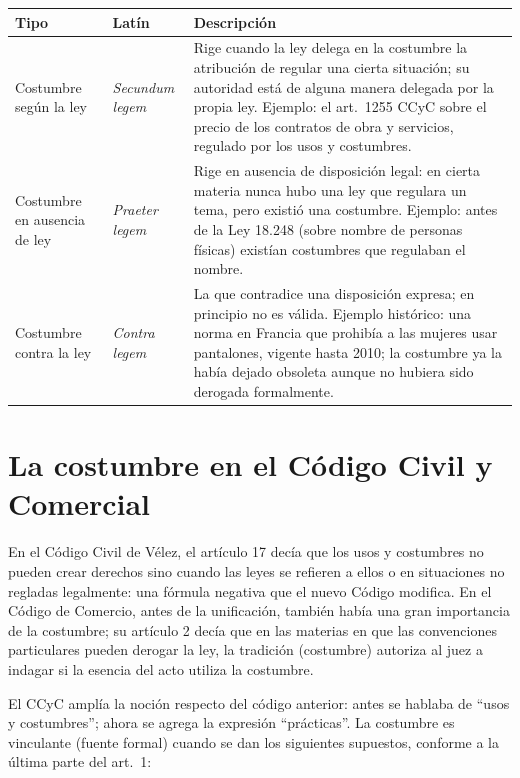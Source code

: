 \documentclass[12pt,oneside]{book}
\begin{document}
\begin{table}[H]
\centering
\begin{tabularx}{\textwidth}{>{\raggedright\arraybackslash}p{} >{\raggedright\arraybackslash}p{} >{\raggedright\arraybackslash}X}
\toprule
\textbf{Tipo} & \textbf{Latín} & \textbf{Descripción} \\
\midrule
Costumbre según la ley & \textit{Secundum legem} &
Rige cuando la ley delega en la costumbre la atribución de regular una cierta situación; su autoridad está de alguna manera delegada por la propia ley. Ejemplo: el art.~1255 CCyC sobre el precio de los contratos de obra y servicios, regulado por los usos y costumbres. \\
\addlinespace
Costumbre en ausencia de ley & \textit{Praeter legem} &
Rige en ausencia de disposición legal: en cierta materia nunca hubo una ley que regulara un tema, pero existió una costumbre. Ejemplo: antes de la Ley 18.248 (sobre nombre de personas físicas) existían costumbres que regulaban el nombre. \\
\addlinespace
Costumbre contra la ley & \textit{Contra legem} &
La que contradice una disposición expresa; en principio no es válida. Ejemplo histórico: una norma en Francia que prohibía a las mujeres usar pantalones, vigente hasta 2010; la costumbre ya la había dejado obsoleta aunque no hubiera sido derogada formalmente. \\
\bottomrule
\end{tabularx}
\end{table}

\section{La costumbre en el Código Civil y Comercial}

En el Código Civil de Vélez, el artículo 17 decía que los usos y costumbres no pueden crear derechos sino cuando las leyes se refieren a ellos o en situaciones no regladas legalmente: una fórmula negativa que el nuevo Código modifica. En el Código de Comercio, antes de la unificación, también había una gran importancia de la costumbre; su artículo 2 decía que en las materias en que las convenciones particulares pueden derogar la ley, la tradición (costumbre) autoriza al juez a indagar si la esencia del acto utiliza la costumbre.

El CCyC amplía la noción respecto del código anterior: antes se hablaba de ``usos y costumbres''; ahora se agrega la expresión ``prácticas''. La costumbre es vinculante (fuente formal) cuando se dan los siguientes supuestos, conforme a la última parte del art.~1:
\end{document}
